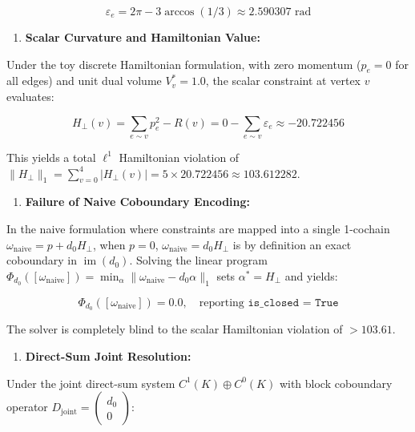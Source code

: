 \documentclass[11pt]{article}
\begin{document}
\begin{equation*}
   \varepsilon_e = 2\pi - 3\arccos(1/3) \approx 2.590307 \text{ rad}
\end{equation*}

\begin{enumerate}[leftmargin=1.4em,itemsep=0.2em]
\item \textbf{Scalar Curvature and Hamiltonian Value:}
\end{enumerate}
Under the toy discrete Hamiltonian formulation, with zero momentum ($p_e = 0$ for all edges) and unit dual volume $V_v^* = 1.0$, the scalar constraint at vertex $v$ evaluates:

\begin{equation*}
   H_\perp(v) = \sum_{e \sim v} p_e^2 - R(v) = 0 - \sum_{e \sim v} \varepsilon_e \approx -20.722456
\end{equation*}

This yields a total $\ell^1$ Hamiltonian violation of $\|H_\perp\|_1 = \sum_{v=0}^4 |H_\perp(v)| = 5 \times 20.722456 \approx 103.612282$.

\begin{enumerate}[leftmargin=1.4em,itemsep=0.2em]
\item \textbf{Failure of Naive Coboundary Encoding:}
\end{enumerate}
In the naive formulation where constraints are mapped into a single 1-cochain $\omega_{\mathrm{naive}} = p + d_0 H_\perp$, when $p = 0$, $\omega_{\mathrm{naive}} = d_0 H_\perp$ is by definition an exact coboundary in $\operatorname{im}(d_0)$. Solving the linear program $\Phi_{d_0}([\omega_{\mathrm{naive}}]) = \min_\alpha \|\omega_{\mathrm{naive}} - d_0 \alpha\|_1$ sets $\alpha^* = H_\perp$ and yields:

\begin{equation*}
   \Phi_{d_0}([\omega_{\mathrm{naive}}]) = 0.0, \quad \text{reporting } \texttt{is\_closed = True}
\end{equation*}

The solver is completely blind to the scalar Hamiltonian violation of $> 103.61$.

\begin{enumerate}[leftmargin=1.4em,itemsep=0.2em]
\item \textbf{Direct-Sum Joint Resolution:}
\end{enumerate}
Under the joint direct-sum system $C^1(K) \oplus C^0(K)$ with block coboundary operator $D_{\mathrm{joint}} = \begin{pmatrix} d_0 \\ 0 \end{pmatrix}$:
\end{document}
